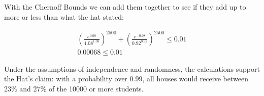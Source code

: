 \documentclass{article}
\begin{document}
\noindent With the Chernoff Bounds we can add them together to see if they add up to more or less than what the hat stated:

\begin{align*}
\left(\frac{e^{0.08}}{1.08^{1.08}} \right)^{2500} + \left(\frac{e^{-0.08}}{0.92^{0.92}} \right)^{2500} \leq 0.01 \\
0.00068 \leq 0.01
\end{align*}

\noindent Under the assumptions of independence and randomness, the calculations support the Hat's claim: with a probability over 0.99, all houses would receive between 23\% and 27\% of the 10000 or more students.



\end{document}
